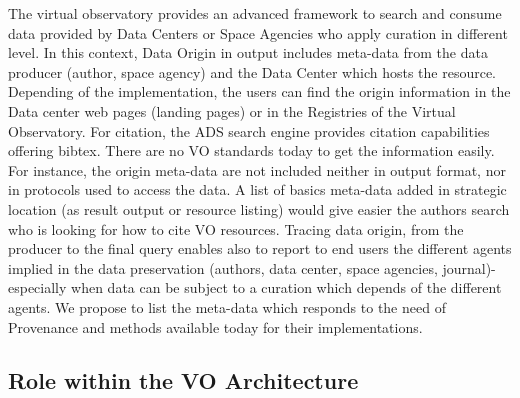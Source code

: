 \documentclass[11pt,a4paper]{ivoa}
\begin{document}
The virtual observatory provides an advanced framework to search and consume data provided by Data Centers or Space Agencies who apply curation in different level.  In this context, Data Origin in output includes meta-data from the data producer (author, space agency) and the Data Center which hosts the resource. 
Depending of the implementation, the users can find the origin information in the Data center web pages (landing pages) or in the Registries of the Virtual Observatory. For citation, the ADS search engine provides citation capabilities offering bibtex. There are no VO standards today to get the information easily. For instance, the origin meta-data are not included neither in output format, nor in protocols used to access the data.
A list of basics meta-data added in strategic location (as result output or resource listing) would give easier the authors search who is looking for how to cite VO resources. Tracing data origin, from the producer to the final query enables also to report to end users the different agents implied in the data preservation (authors, data center, space agencies, journal)- especially when data can be subject to a curation  which depends of the different agents.
We propose to list the meta-data which responds to the need of Provenance and methods available today for their implementations. 

\subsection{Role within the VO Architecture}





\end{document}
